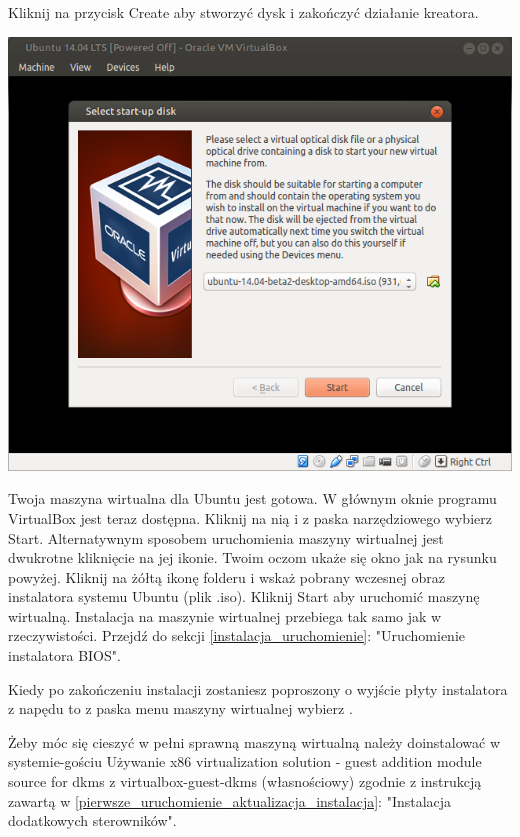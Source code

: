 Kliknij na przycisk \textcolor{ubuntu_orange}{Create} aby stworzyć dysk i zakończyć działanie kreatora.

\clearpage
\begin{center}
	\includegraphics[width=\linewidth]{images/virtualbox_start.png}
\end{center}

Twoja maszyna wirtualna dla Ubuntu jest gotowa. W głównym oknie programu VirtualBox jest teraz dostępna. Kliknij na nią i z paska narzędziowego wybierz \textcolor{ubuntu_orange}{Start}. Alternatywnym sposobem uruchomienia maszyny wirtualnej jest dwukrotne kliknięcie na jej ikonie. Twoim oczom ukaże się okno jak na rysunku powyżej. Kliknij na żółtą ikonę folderu i wskaż pobrany wczesnej obraz instalatora systemu Ubuntu (plik .iso). Kliknij \textcolor{ubuntu_orange}{Start} aby uruchomić maszynę wirtualną. Instalacja na maszynie wirtualnej przebiega tak samo jak w rzeczywistości. Przejdź do sekcji \ref{instalacja_uruchomienie}: "Uruchomienie instalatora BIOS".

Kiedy po zakończeniu instalacji zostaniesz poproszony o wyjście płyty instalatora z napędu to z paska menu maszyny wirtualnej wybierz .

Żeby móc się cieszyć w pełni sprawną maszyną wirtualną należy doinstalować w systemie-gościu \textcolor{ubuntu_orange}{Używanie x86 virtualization solution - guest addition module source for dkms z virtualbox-guest-dkms (własnościowy)} zgodnie z instrukcją zawartą w \ref{pierwsze_uruchomienie_aktualizacja_instalacja}: "Instalacja dodatkowych sterowników".
\clearpage

